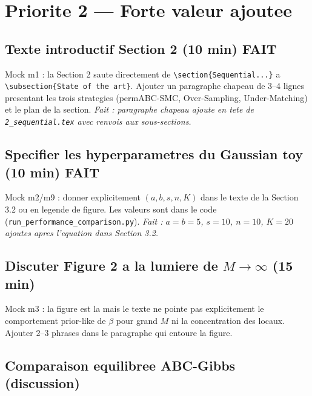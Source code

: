 \documentclass[11pt]{article}
\newcommand{\done}{\textcolor{done}{\textbf{FAIT}}}
\begin{document}
\section{Priorite 2 --- Forte valeur ajoutee}

\subsection{Texte introductif Section 2 (10 min) \done}

Mock m1 : la Section 2 saute directement de \verb|\section{Sequential...}| a \verb|\subsection{State of the art}|. Ajouter un paragraphe chapeau de 3--4 lignes presentant les trois strategies (permABC-SMC, Over-Sampling, Under-Matching) et le plan de la section. \textit{Fait : paragraphe chapeau ajoute en tete de \texttt{2\_sequential.tex} avec renvois aux sous-sections.}

\subsection{Specifier les hyperparametres du Gaussian toy (10 min) \done}

Mock m2/m9 : donner explicitement $(a, b, s, n, K)$ dans le texte de la Section 3.2 ou en legende de figure. Les valeurs sont dans le code (\texttt{run\_performance\_comparison.py}). \textit{Fait : $a=b=5$, $s=10$, $n=10$, $K=20$ ajoutes apres l'equation dans Section 3.2.}

\subsection{Discuter Figure 2 a la lumiere de $M\to\infty$ (15 min)}

Mock m3 : la figure est la mais le texte ne pointe pas explicitement le comportement prior-like de $\beta$ pour grand $M$ ni la concentration des locaux. Ajouter 2--3 phrases dans le paragraphe qui entoure la figure.

\subsection{Comparaison equilibree ABC-Gibbs (discussion)}
\end{document}

